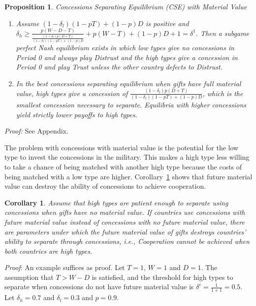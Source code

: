 \documentclass[bibtex,autowc]{apsr_submission}
\newcommand{\de}{\delta}
\newtheorem{proposition}{Proposition}
\newtheorem{corollary}{Corollary}
\begin{document}
\begin{proposition}
\emph{Concessions Separating Equilibrium (CSE) with Material Value}
	\begin{enumerate}
		\item[(a)] Assume $\left(1-\de_l\right)\left(1 - pT \right) + (1-p) D$ is positive and $\de_h \geq \frac{p(W-D-T)}{\frac{\left(1-\de_l\right)p\left(D +	 T\right)}{\left(1-\de_l\right)\left(1 - pT \right) + (1-p) D}} + p (W-T) + (1-p)D + 1 = \de^{1}$. Then a subgame perfect Nash equilibrium exists in which low types give no concessions in Period 0 and always play Distrust and the high types give a concession in Period 0 and play Trust unless the other country defects to Distrust.
		\item[(b)] In the best \emph{concessions separating equilibrium} when gifts have full material value, high types give a concession of $\frac{\left(1-\de_l\right)p\left(D + T\right)}{\left(1-\de_l\right)\left(1 - pT \right) + (1-p) D}$, which is the smallest concession necessary to separate. Equilibria with higher concessions yield strictly lower payoffs to high types.
\end{enumerate}
	\label{proposition:csemv}
\end{proposition}
\vspace{-5pt}
\emph{Proof:} See Appendix.

The problem with concessions with material value is the potential for the low type to invest the concessions in the military. This makes a high type less willing to take a chance of being matched with another high type because the costs of being matched with a low type are higher. Corollary~\ref{corollary:matval} shows that future material value can destroy the ability of concessions to achieve cooperation.

\begin{corollary}
	Assume that high types are patient enough to separate using concessions when gifts have no material value. If countries use concessions with future material value instead of concessions with no future material value, there are parameters under which the future material value of gifts destroys countries' ability to separate through concessions, i.e., Cooperation cannot be achieved when both countries are high types.
	\label{corollary:matval}
\end{corollary}

\emph{Proof}: An example suffices as proof. Let $T = 1$, $W=1$ and $D = 1$. The assumption that $T > W - D$ is satisfied, and the threshold for high types to separate when concessions do not have future material value is $\de^c = \frac{1}{1+1} = 0.5$. Let $\de_h = 0.7$ and $\de_l = 0.3$ and $p = 0.9$.
\end{document}
